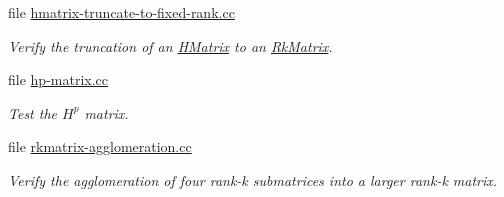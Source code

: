\begin{DoxyCompactItemize}
file \hyperlink{hmatrix-truncate-to-fixed-rank_8cc}{hmatrix-\/truncate-\/to-\/fixed-\/rank.\+cc}
\begin{DoxyCompactList}\small\item\em Verify the truncation of an \hyperlink{classHMatrix}{H\+Matrix} to an \hyperlink{classRkMatrix}{Rk\+Matrix}. \end{DoxyCompactList}\item 
file \hyperlink{hp-matrix_8cc}{hp-\/matrix.\+cc}
\begin{DoxyCompactList}\small\item\em Test the $H^p$ matrix. \end{DoxyCompactList}\item 
file \hyperlink{rkmatrix-agglomeration_8cc}{rkmatrix-\/agglomeration.\+cc}
\begin{DoxyCompactList}\small\item\em Verify the agglomeration of four rank-\/k submatrices into a larger rank-\/k matrix. \end{DoxyCompactList}\end{DoxyCompactItemize}
